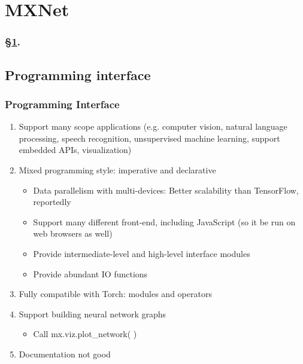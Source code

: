 
\section{MXNet}\label{sec:MxNet}


\frameinlbffalse

{

\begin{frame}[plain]
\frametitle{\S\ref{sec:MxNet}. \insertsection}
\listofframes
\end{frame}
\addtocounter{framenumber}{-1} %

}

\frameinlbftrue

\subsection{Programming interface}

\begin{frame}
  \MyLogo
  \frametitle{Programming Interface}  

\begin{enumerate}
%
\item Support many scope applications (e.g. computer vision, natural language processing,  speech recognition, unsupervised machine learning, support embedded APIs, visualization)
%
\item Mixed programming style: imperative and declarative
\begin{itemize}
\item Data parallelism with multi-devices: Better scalability than TensorFlow, reportedly
\item Support many different front-end, including JavaScript (so it be run on web browsers as well)
\item Provide intermediate-level and high-level interface modules
\item Provide abundant IO functions 
%
\end{itemize}
%
\item Fully compatible with Torch: modules and operators
%
\item Support building neural network graphs
\begin{itemize}
\item Call mx.viz.plot\_network( )
\end{itemize}
%
\item Documentation not good
%
\end{enumerate}

\end{frame}

